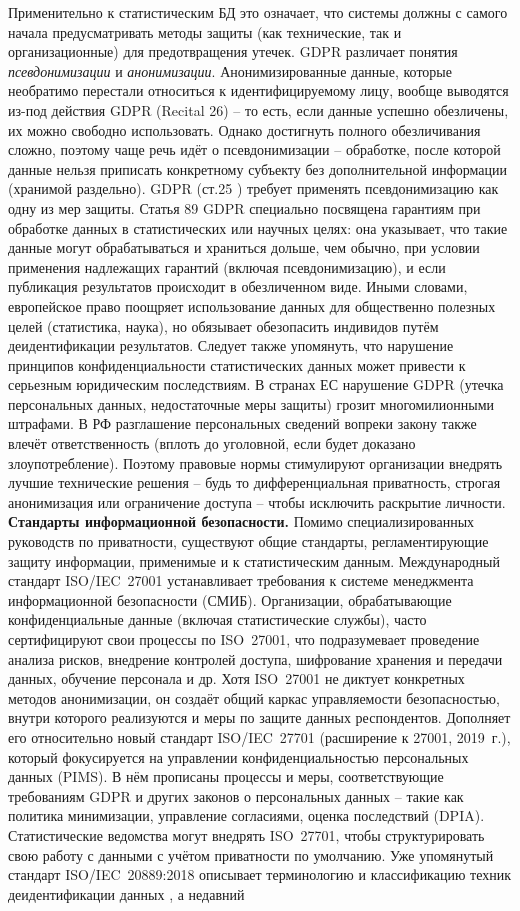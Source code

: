 Применительно к статистическим БД это означает, что системы должны с самого начала предусматривать методы защиты (как технические, так и организационные) для предотвращения утечек. GDPR различает понятия \textit{псевдонимизации} и \textit{анонимизации}. Анонимизированные данные, которые необратимо перестали относиться к идентифицируемому лицу, вообще выводятся из-под действия GDPR (Recital 26) – то есть, если данные успешно обезличены, их можно свободно использовать. Однако достигнуть полного обезличивания сложно, поэтому чаще речь идёт о псевдонимизации – обработке, после которой данные нельзя приписать конкретному субъекту без дополнительной информации (хранимой раздельно). GDPR (ст.25 \autocite{GDPR25}) требует применять псевдонимизацию как одну из мер защиты. Статья 89 GDPR \autocite{GDPR89} специально посвящена гарантиям при обработке данных в статистических или научных целях: она указывает, что такие данные могут обрабатываться и храниться дольше, чем обычно, при условии применения надлежащих гарантий (включая псевдонимизацию), и если публикация результатов происходит в обезличенном виде. Иными словами, европейское право поощряет использование данных для общественно полезных целей (статистика, наука), но обязывает обезопасить индивидов путём деидентификации результатов. Следует также упомянуть, что нарушение принципов конфиденциальности статистических данных может привести к серьезным юридическим последствиям. В странах ЕС нарушение GDPR (утечка персональных данных, недостаточные меры защиты) грозит многомилионными штрафами. В РФ разглашение персональных сведений вопреки закону также влечёт ответственность (вплоть до уголовной, если будет доказано злоупотребление). Поэтому правовые нормы стимулируют организации внедрять лучшие технические решения – будь то дифференциальная приватность, строгая анонимизация или ограничение доступа – чтобы исключить раскрытие личности. \textbf{Стандарты информационной безопасности.} Помимо специализированных руководств по приватности, существуют общие стандарты, регламентирующие защиту информации, применимые и к статистическим данным. Международный стандарт ISO/IEC 27001 устанавливает требования к системе менеджмента информационной безопасности (СМИБ). Организации, обрабатывающие конфиденциальные данные (включая статистические службы), часто сертифицируют свои процессы по ISO 27001, что подразумевает проведение анализа рисков, внедрение контролей доступа, шифрование хранения и передачи данных, обучение персонала и др. Хотя ISO 27001 не диктует конкретных методов анонимизации, он создаёт общий каркас управляемости безопасностью, внутри которого реализуются и меры по защите данных респондентов. Дополняет его относительно новый стандарт ISO/IEC 27701 (расширение к 27001, 2019 г.), который фокусируется на управлении конфиденциальностью персональных данных (PIMS). В нём прописаны процессы и меры, соответствующие требованиям GDPR и других законов о персональных данных – такие как политика минимизации, управление согласиями, оценка последствий (DPIA). Статистические ведомства могут внедрять ISO 27701, чтобы структурировать свою работу с данными с учётом приватности по умолчанию. Уже упомянутый стандарт ISO/IEC 20889:2018 описывает терминологию и классификацию техник деидентификации данных \autocite{ISO-IEC-20889-2018}, а недавний 